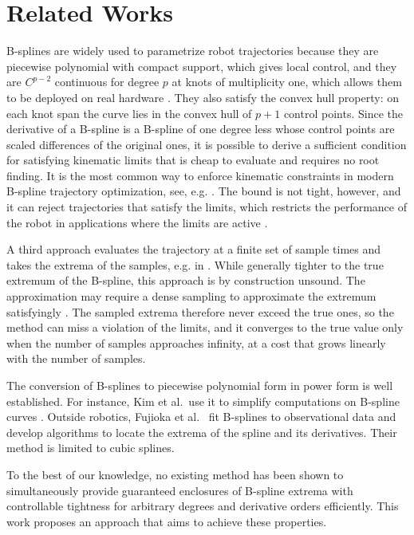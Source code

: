 \documentclass[final,5p,times,twocolumn]{elsarticle}
\theoremstyle{definition}
\begin{document}
\section{Related Works} \label{sec:related_works}
B-splines are widely used to parametrize robot trajectories because they are piecewise polynomial with compact support, which gives local control, and they are $C^{p-2}$ continuous for degree $p$ at knots of multiplicity one, which allows them to be deployed on real hardware \cite{Gasparetto2007,Liu2013,Lu2017}. They also satisfy the convex hull property: on each knot span the curve lies in the convex hull of $p+1$ control points. Since the derivative of a B-spline is a B-spline of one degree less whose control points are scaled differences of the original ones, it is possible to derive a sufficient condition for satisfying kinematic limits that is cheap to evaluate and requires no root finding. It is the most common way to enforce kinematic constraints in modern B-spline trajectory optimization, see, e.g. \cite{Zhou2023,Wang2022}. The bound is not tight, however, and it can reject trajectories that satisfy the limits, which restricts the performance of the robot in applications where the limits are active \cite{de1974splines, Loock2015}.

A third approach evaluates the trajectory at a finite set of sample times and takes the extrema of the samples, e.g. in \cite{Paing2022,Gallant2018, doiron2026accelerating}. While generally tighter to the true extremum of the B-spline, this approach is by construction unsound. The approximation may require a dense sampling to approximate the extremum satisfyingly \cite{Paing2022}. The sampled extrema therefore never exceed the true ones, so the method can miss a violation of the limits, and it converges to the true value only when the number of samples approaches infinity, at a cost that grows linearly with the number of samples.

The conversion of B-splines to piecewise polynomial form in power form is well established. For instance, Kim et al.\ use it to simplify computations on B-spline curves \cite{Kim2002}. Outside robotics, Fujioka et al.\ \cite{Fujioka2005} fit B-splines to observational data and develop algorithms to locate the extrema of the spline and its derivatives. Their method is limited to cubic splines.

To the best of our knowledge, no existing method has been shown to simultaneously provide guaranteed enclosures of B-spline extrema with controllable tightness for arbitrary degrees and derivative orders efficiently. This work proposes an approach that aims to achieve these properties.
\end{document}
